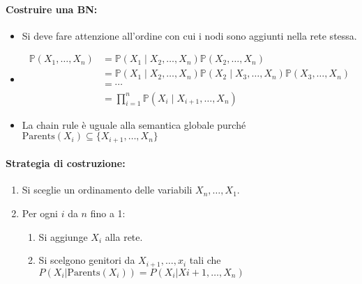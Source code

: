 
\paragraph{Costruire una BN:}

\begin{itemize}
  \item Si deve fare attenzione all'ordine con cui i nodi sono aggiunti nella rete stessa. 
  \item {}
    \begin{align*}
\mathbb{P}(X_1, \ldots, X_n) 
&= \mathbb{P}(X_1 \mid X_2, \ldots, X_n) \mathbb{P}(X_2, \ldots, X_n) \\
&= \mathbb{P}(X_1 \mid X_2, \ldots, X_n) \mathbb{P}(X_2 \mid X_3, \ldots, X_n) \mathbb{P}(X_3, \ldots, X_n) \\
&= \cdots \\
&= \prod_{i=1}^{n} \mathbb{P}(X_i \mid X_{i+1}, \ldots, X_n)
\end{align*}
\item La chain rule è uguale alla semantica globale purché $\text{Parents}(X_i) \subseteq \{X_{i+1},\dots, X_n\}$
\end{itemize}


\paragraph{Strategia di costruzione:}

\begin{enumerate}
  \item Si sceglie un ordinamento delle variabili $X_n, \dots, X_1$.
  \item Per ogni $i$ da $n$ fino a 1:
    \begin{enumerate}
      \item Si aggiunge $X_i$ alla rete. 
      \item Si scelgono genitori da $X_{i+1},\dots, x_i$ tali che $P(X_i|\text{Parents}(X_i)) = P(X_i|X{i+1},\dots, X_n)$
    \end{enumerate}
\end{enumerate}

